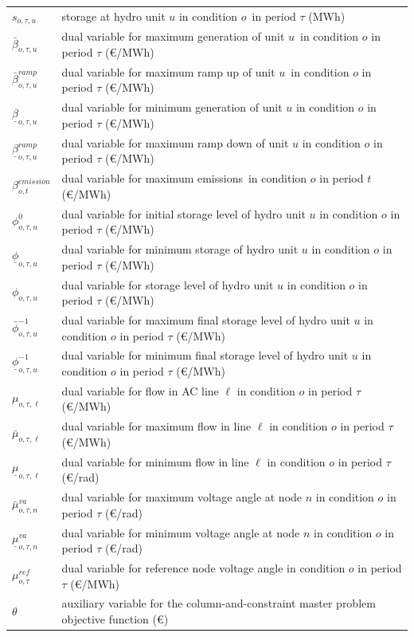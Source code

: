 \documentclass[final]{IEEEtran}
\begin{document}
\begin{supertabular}{p{1.5cm} p{6.5cm}}
	$s_{o, \tau, u}$ 						& storage at hydro unit $u$ in condition $o$ in period $\tau$ (MWh) \\
	$\bar{\beta}_{o, \tau, u}$ & dual variable for maximum generation of unit $u$ in condition $o$ in period $\tau$ (€/MWh) \\
	$\bar{\beta}_{o, \tau, u}^{ramp}$ & dual variable for maximum ramp up of unit $u$ in condition $o$ in period $\tau$ (€/MWh) \\
	$\underline{\beta}_{o, \tau, u}$ & dual variable for minimum generation of unit $u$ in condition $o$ in period $\tau$ (€/MWh) \\
	$\underline{\beta}_{o, \tau, u}^{ramp}$	& dual variable for maximum ramp down of unit $u$ in condition $o$ in period $\tau$ (€/MWh) \\
	$\beta_{o, t}^{emission}$ & dual variable for maximum emissions in condition $o$ in period $t$ (€/MWh) \\
	$\phi_{o, \tau, u}^{0}$ & dual variable for initial storage level of hydro unit $u$ in condition $o$ in period $\tau$ (€/MWh) \\
	$\underline{\phi}_{o, \tau, u}$ & dual variable for minimum storage of hydro unit $u$ in condition $o$ in period $\tau$ (€/MWh) \\
	$\phi_{o, \tau, u}$ & dual variable for storage level of hydro unit $u$ in condition $o$ in period $\tau$ (€/MWh) \\
	$\bar{\phi}_{o, \tau, u}^{-1}$ & dual variable for maximum final storage level of hydro unit $u$ in condition $o$ in period $\tau$ (€/MWh) \\
	$\underline{\phi}_{o, \tau, u}^{-1}$ & dual variable for minimum final storage level of hydro unit $u$ in condition $o$ in period $\tau$ (€/MWh) \\
	$\mu_{o, \tau, \ell}$ 	& dual variable for flow in AC line $\ell$ in condition $o$ in period $\tau$ (€/MWh) \\
	$\bar{\mu}_{o, \tau, \ell}$	& dual variable for maximum flow in line $\ell$ in condition $o$ in period $\tau$ (€/MWh) \\
	$\underline{\mu}_{o, \tau, \ell}$ & dual variable for minimum flow in line $\ell$ in condition $o$ in period $\tau$ (€/rad) \\
	$\bar{\mu}^{va}_{o, \tau, n}$ & dual variable for maximum voltage angle at node $n$ in condition $o$ in period $\tau$ (€/rad) \\
	$\underline{\mu}^{va}_{o, \tau, n}$ & dual variable for minimum voltage angle at node $n$ in condition $o$ in period $\tau$ (€/rad) \\
	$\mu^{ref}_{o, \tau}$ & dual variable for reference node voltage angle in condition $o$ in period $\tau$ (€/MWh) \\
	$\theta$ 	& auxiliary variable for the column-and-constraint master problem objective function (€)
\end{supertabular}
\end{document}
